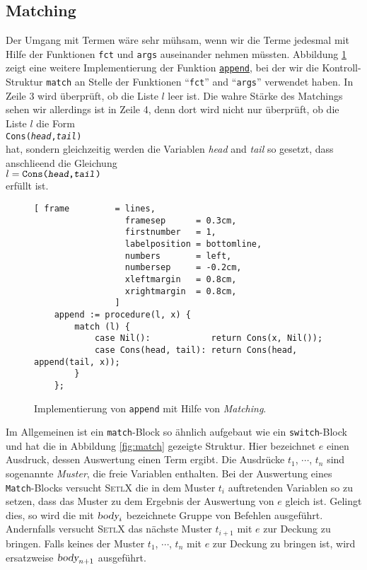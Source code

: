 \subsection{Matching}
Der Umgang mit Termen w\"{a}re sehr m\"{u}hsam, wenn wir die Terme jedesmal mit Hilfe der Funktionen
\texttt{fct} und \texttt{args} auseinander nehmen m\"{u}ssten.  Abbildung \ref{fig:append-match.stlx} 
zeigt eine weitere Implementierung der Funktion
\href{https://github.com/karlstroetmann/Logik/blob/master/SetlX/append-match.stlx}{\texttt{append}}, 
bei der wir die Kontroll-Struktur \texttt{match} an Stelle der Funktionen ``\texttt{fct}''
and ``\texttt{args}'' verwendet haben.  In Zeile 3 wird  \"{u}berpr\"{u}ft, ob die Liste $l$ leer ist.
Die wahre St\"{a}rke des Matchings sehen wir allerdings ist in Zeile 4, denn dort wird nicht nur
\"{u}berpr\"{u}ft, ob die Liste $l$ die Form
\\[0.2cm]
\hspace*{1.3cm}
\texttt{Cons(\textsl{head},\textsl{tail})}
\\[0.2cm]
hat, sondern gleichzeitig werden die Variablen \textsl{head} and \textsl{tail} so gesetzt, dass
anschlie\3end die Gleichung
\\[0.2cm]
\hspace*{1.3cm}
$l = \texttt{Cons(\textsl{head},\textsl{tail})}$
\\[0.2cm]
erf\"{u}llt ist.


\begin{figure}[!ht]
\centering
\begin{Verbatim}[ frame         = lines, 
                  framesep      = 0.3cm, 
                  firstnumber   = 1,
                  labelposition = bottomline,
                  numbers       = left,
                  numbersep     = -0.2cm,
                  xleftmargin   = 0.8cm,
                  xrightmargin  = 0.8cm,
                ]
    append := procedure(l, x) {
        match (l) {
            case Nil():            return Cons(x, Nil());
            case Cons(head, tail): return Cons(head, append(tail, x));
        }
    };
\end{Verbatim}
\vspace*{-0.3cm}
\caption{Implementierung von \texttt{append} mit Hilfe von \emph{Matching}.}
\label{fig:append-match.stlx}
\end{figure}

Im Allgemeinen ist  ein \texttt{match}-Block so \"{a}hnlich aufgebaut wie ein
\texttt{switch}-Block und hat die in Abbildung \ref{fig:match} gezeigte Struktur.
Hier bezeichnet $e$ einen Ausdruck, dessen Auswertung einen Term ergibt.  
Die Ausdr\"{u}cke $t_1$, $\cdots$, $t_n$ sind sogenannte \emph{Muster}, die freie
Variablen enthalten.  Bei der Auswertung eines \texttt{Match}-Blocks versucht
\textsc{SetlX} die in dem Muster $t_i$ auftretenden Variablen so zu setzen, dass das Muster
zu dem Ergebnis der Auswertung von $e$ gleich ist.  Gelingt dies, so wird die
mit $\textsl{body}_i$ bezeichnete Gruppe von Befehlen ausgef\"{u}hrt.  Andernfalls
versucht \textsc{SetlX} das n\"{a}chste Muster $t_{i+1}$ mit $e$ zur Deckung zu bringen.
Falls keines der Muster $t_1$, $\cdots$, $t_n$ mit $e$ zur Deckung zu bringen ist, wird
ersatzweise $\textsl{body}_{n+1}$ ausgef\"{u}hrt.  

